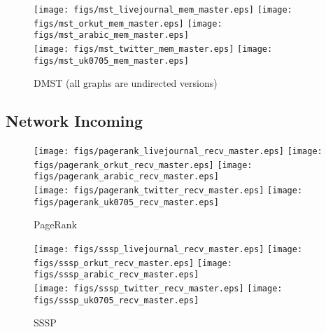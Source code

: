 \documentclass{article}
\newcommand{\bline}[1][1]{\vspace{#1\baselineskip}}
\begin{document}
\begin{figure}[!h]
  \bline[3.5]
  \centering
  \texttt{[image: figs/mst\_livejournal\_mem\_master.eps]}\hspace{1em}%
  \texttt{[image: figs/mst\_orkut\_mem\_master.eps]}\hspace{1em}%
  \texttt{[image: figs/mst\_arabic\_mem\_master.eps]}\\
  \texttt{[image: figs/mst\_twitter\_mem\_master.eps]}\hspace{1em}%
  \texttt{[image: figs/mst\_uk0705\_mem\_master.eps]}
  \caption{DMST (all graphs are undirected versions)}
\end{figure}

\pagebreak
\subsection{Network Incoming}
\begin{figure}[!h]
  \bline[1]
  \centering
  \texttt{[image: figs/pagerank\_livejournal\_recv\_master.eps]}\hspace{1em}%
  \texttt{[image: figs/pagerank\_orkut\_recv\_master.eps]}\hspace{1em}%
  \texttt{[image: figs/pagerank\_arabic\_recv\_master.eps]}\\
  \texttt{[image: figs/pagerank\_twitter\_recv\_master.eps]}\hspace{1em}%
  \texttt{[image: figs/pagerank\_uk0705\_recv\_master.eps]}
  \caption{PageRank}
\end{figure}

\begin{figure}[!h]
  \bline[3.5]
  \centering
  \texttt{[image: figs/sssp\_livejournal\_recv\_master.eps]}\hspace{1em}%
  \texttt{[image: figs/sssp\_orkut\_recv\_master.eps]}\hspace{1em}%
  \texttt{[image: figs/sssp\_arabic\_recv\_master.eps]}\\
  \texttt{[image: figs/sssp\_twitter\_recv\_master.eps]}\hspace{1em}%
  \texttt{[image: figs/sssp\_uk0705\_recv\_master.eps]}
  \caption{SSSP}
\end{figure}
\end{document}
